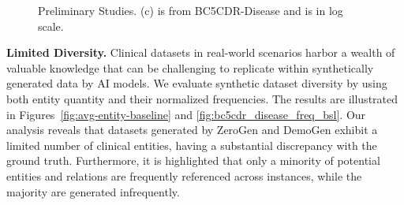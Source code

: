 
 \begin{figure}
	\centering
	\vspace{-4.5ex}
         \hspace{-1.5ex}
 \hspace{-1.5ex}
 \vspace{-2ex}
	\caption{Preliminary Studies. (c) is from BC5CDR-Disease and is in log scale. \vspace{-3ex}}

\label{fig:prelim2}
\end{figure}

\textbf{Limited Diversity.}
Clinical datasets in real-world scenarios harbor a wealth of valuable knowledge that can be challenging to replicate within synthetically generated data by AI models. We evaluate synthetic dataset diversity by using both entity quantity and their normalized frequencies. The results are illustrated in Figures~\ref{fig:avg-entity-baseline} and \ref{fig:bc5cdr_disease_freq_bsl}. Our analysis reveals that datasets generated by ZeroGen and DemoGen exhibit a limited number of clinical entities, having a substantial discrepancy with the ground truth. 
Furthermore, it is highlighted that only a minority of potential entities and relations are frequently referenced across instances, while the majority are generated infrequently.


